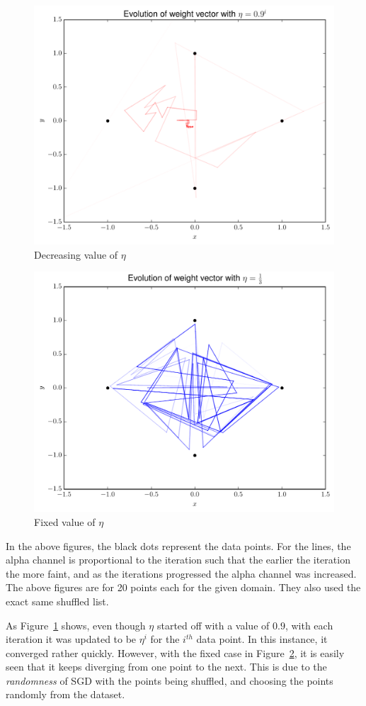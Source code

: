 \documentclass[12pt]{article}
\begin{document}
\begin{enumerate}
\begin{enumerate}
\begin{figure}[H]
\centering
\includegraphics[width=.75\linewidth]{Decreasing.pdf}
\caption{Decreasing value of $\eta$}
\label{fig:dec}
\end{figure}


\begin{figure}[H]
\centering
\includegraphics[width=.75\linewidth]{Fixed.pdf}
\caption{Fixed value of $\eta$}
\label{fig:fix}
\end{figure}

In the above figures, the black dots represent the data points. For the lines, the alpha channel is proportional to the iteration such that the earlier the iteration the more faint, and as the iterations progressed the alpha channel was increased. The above figures are for 20 points each for the given domain. They also used the exact same shuffled list.

As Figure~\ref{fig:dec} shows, even though $\eta$ started off with a value of $0.9$, with each iteration it was updated to be $\eta^{i}$ for the $i^{th}$ data point. In this instance, it converged rather quickly. However, with the fixed case in Figure~\ref{fig:fix}, it is easily seen that it keeps diverging from one point to the next. This is due to the {\em randomness} of SGD with the points being shuffled, and choosing the points randomly from the dataset. 


\end{enumerate}
\end{enumerate}
\end{document}
